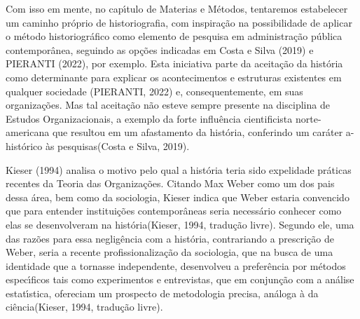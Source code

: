 \documentclass[
12pt,		%
openright,	%
twoside,  %
a4paper,			%
chapter=TITLE,		%
english,			%
french,				%
spanish,			%
brazil				%
]{USPSC-classe/USPSC}
\begin{document}
\noindent\begin{center}\mbox{\centering{}}\end{center}


Com isso em mente, no cap\'{\i}tulo de Materias e M\'etodos, tentaremos estabelecer um caminho pr\'oprio de historiografia, com inspira\c{c}\~ao na possibilidade de aplicar o m\'etodo historiogr\'afico como elemento de pesquisa em administra\c{c}\~ao p\'ublica contempor\^anea, seguindo as op\c{c}\~oes indicadas em   Costa e Silva (2019) e PIERANTI (2022), por exemplo. Esta iniciativa parte da aceita\c{c}\~ao da hist\'oria como determinante para explicar os acontecimentos e estruturas existentes em qualquer sociedade (PIERANTI, 2022) e, consequentemente, em suas organiza\c{c}\~oes. Mas tal aceita\c{c}\~ao n\~ao esteve sempre presente na disciplina de Estudos Organizacionais, a exemplo da \textquotedbl forte influ\^encia cientificista norte-americana que resultou em um afastamento da hist\'oria, conferindo um car\'ater a-hist\'orico \`as pesquisas\textquotedbl   (Costa e Silva, 2019).

















 Kieser (1994)  analisa o motivo pelo qual a hist\'oria teria sido \textquotedbl expelida\textquotedbl  de pr\'aticas recentes da Teoria das Organiza\c{c}\~oes. Citando Max Weber como um dos pais dessa \'area, bem como da sociologia, Kieser indica que Weber estaria \textquotedbl convencido que para entender institui\c{c}\~oes contempor\^aneas seria necess\'ario conhecer como elas se desenvolveram na hist\'oria\textquotedbl   (Kieser, 1994, tradu\c{c}\~ao livre). Segundo ele, uma das raz\~oes para essa neglig\^encia com a hist\'oria, contrariando a prescri\c{c}\~ao de Weber, seria a recente profissionaliza\c{c}\~ao da sociologia, que na busca de uma identidade que a tornasse independente, desenvolveu a prefer\^encia por m\'etodos espec\'{\i}ficos tais como experimentos e entrevistas, que \textquotedbl em conjun\c{c}\~ao com a an\'alise estat\'{\i}stica, ofereciam um prospecto de metodologia precisa, an\'aloga \`a da ci\^encia\textquotedbl   (Kieser, 1994, tradu\c{c}\~ao livre).
\end{document}
